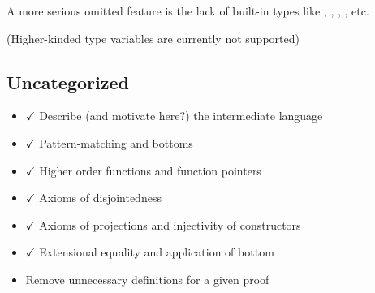 A more serious omitted feature is the lack of built-in types like ,
, , , etc.

(Higher-kinded type variables are currently not supported)

\subsection{Uncategorized}

\begin{itemize}

\item $\checkmark$ Describe (and motivate here?) the intermediate language

\item $\checkmark$ Pattern-matching and bottoms

\item $\checkmark$ Higher order functions and function pointers

\item $\checkmark$ Axioms of disjointedness

\item $\checkmark$ Axioms of projections and injectivity of constructors

\item $\checkmark$ Extensional equality and application of bottom

\item Remove unnecessary definitions for a given proof

\end{itemize}